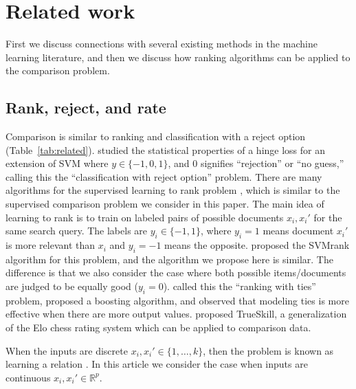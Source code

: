 \documentclass{article}
\newcommand{\RR}{\mathbb R}
\begin{document}
\section{Related work}
\label{sec:related}

First we discuss connections with several existing methods in the
machine learning literature, and then we discuss how ranking
algorithms can be applied to the comparison problem.

\subsection{Rank, reject, and rate}

Comparison is similar to ranking and classification with a reject
option (Table~\ref{tab:related}). 
\citet{reject-option} studied the
statistical properties of a hinge loss for an extension of SVM where
$y\in\{-1,0,1\}$, and 0 signifies ``rejection'' or ``no guess,''
calling this the ``classification with reject option'' problem.  There
are many algorithms for the supervised learning to rank problem
\citep{learning-to-rank}, which is similar to the supervised
comparison problem we consider in this paper. The main idea of
learning to rank is to train on labeled pairs of possible documents
$x_i,x_i'$ for the same search query. The labels are $y_i\in\{-1,1\}$,
where $y_i=1$ means document $x_i'$ is more relevant than $x_i$ and
$y_i=-1$ means the opposite. \citet{ranksvm} proposed the SVMrank
algorithm for this problem, and the algorithm we propose here is
similar. The difference is that we also consider the case where both
possible items/documents are judged to be equally good ($y_i=0$).
\citet{rank-with-ties} called this the ``ranking with ties'' problem,
proposed a boosting algorithm, and observed that modeling ties is more
effective when there are more output values. \citet{trueskill}
proposed TrueSkill, a generalization of the Elo chess rating system
which can be applied to comparison data. 

When the inputs are discrete $x_i,x_i'\in\{1,\dots,k\}$, then the
problem is known as learning a relation \citep{relations}. In this
article we consider the case when inputs are continuous
$x_i,x_i'\in\RR^p$.



\end{document}
